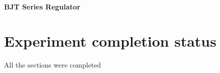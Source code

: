 \documentclass[12pt]{article}
\begin{document}
\textbf{\large BJT Series Regulator}
\begin{figure}[H]
  \begin{center}
\end{center}
\end{figure}
\begin{figure}[H]
  \begin{center}
\end{center}
\end{figure}
\begin{figure}[H]
  \begin{center}
\end{center}
\end{figure}


\section{Experiment completion status}
All the sections were completed
\end{document}
